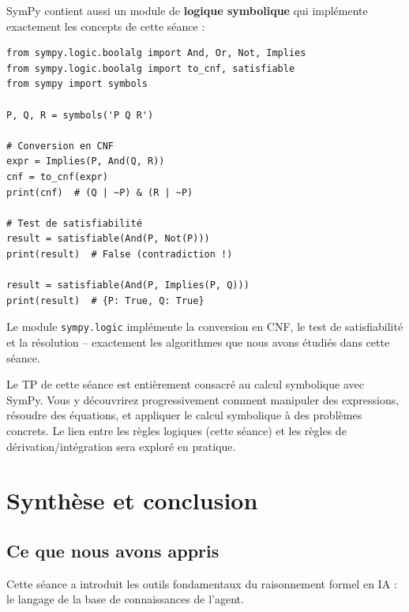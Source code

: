 \documentclass[11pt,a4paper]{article}
\begin{document}
\begin{exemplebox}
SymPy contient aussi un module de \textbf{logique symbolique} qui implémente exactement les concepts de cette séance :
\begin{lstlisting}
from sympy.logic.boolalg import And, Or, Not, Implies
from sympy.logic.boolalg import to_cnf, satisfiable
from sympy import symbols

P, Q, R = symbols('P Q R')

# Conversion en CNF
expr = Implies(P, And(Q, R))
cnf = to_cnf(expr)
print(cnf)  # (Q | ~P) & (R | ~P)

# Test de satisfiabilité
result = satisfiable(And(P, Not(P)))
print(result)  # False (contradiction !)

result = satisfiable(And(P, Implies(P, Q)))
print(result)  # {P: True, Q: True}
\end{lstlisting}

Le module \texttt{sympy.logic} implémente la conversion en CNF, le test de satisfiabilité et la résolution -- exactement les algorithmes que nous avons étudiés dans cette séance.
\end{exemplebox}

\begin{attentionbox}
Le TP de cette séance est entièrement consacré au calcul symbolique avec SymPy. Vous y découvrirez progressivement comment manipuler des expressions, résoudre des équations, et appliquer le calcul symbolique à des problèmes concrets. Le lien entre les règles logiques (cette séance) et les règles de dérivation/intégration sera exploré en pratique.
\end{attentionbox}

\section{Synthèse et conclusion}

\subsection{Ce que nous avons appris}

Cette séance a introduit les outils fondamentaux du raisonnement formel en IA : le langage de la base de connaissances de l'agent.
\end{document}
